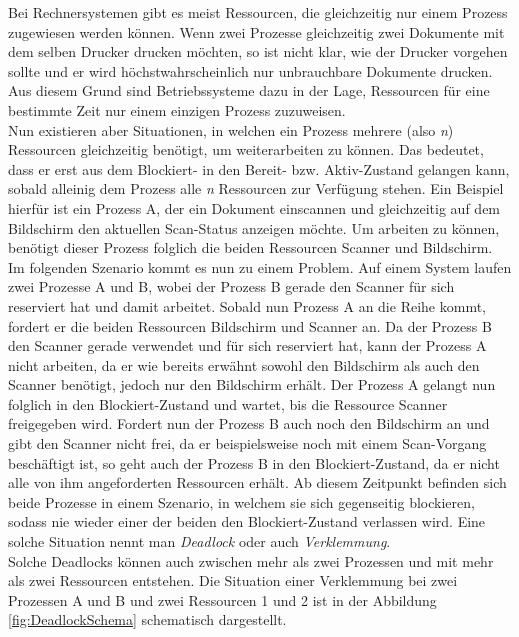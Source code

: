 				Bei Rechnersystemen gibt es meist Ressourcen, die gleichzeitig nur einem Prozess zugewiesen werden können. Wenn zwei Prozesse gleichzeitig zwei Dokumente mit dem selben Drucker drucken möchten, so ist nicht klar, wie der Drucker vorgehen sollte und er wird höchstwahrscheinlich nur unbrauchbare Dokumente drucken. Aus diesem Grund sind Betriebssysteme dazu in der Lage, Ressourcen für eine bestimmte Zeit nur einem einzigen Prozess zuzuweisen.\\
				Nun existieren aber Situationen, in welchen ein Prozess mehrere (also \textit{n}) Ressourcen gleichzeitig benötigt, um weiterarbeiten zu können. Das bedeutet, dass er erst aus dem Blockiert- in den Bereit- bzw. Aktiv-Zustand gelangen kann, sobald alleinig dem Prozess alle \textit{n} Ressourcen zur Verfügung stehen. Ein Beispiel hierfür ist ein Prozess A, der ein Dokument einscannen und gleichzeitig auf dem Bildschirm den aktuellen Scan-Status anzeigen möchte. Um arbeiten zu können, benötigt dieser Prozess folglich die beiden Ressourcen Scanner und Bildschirm.\\
				Im folgenden Szenario kommt es nun zu einem Problem. Auf einem System laufen zwei Prozesse A und B, wobei der Prozess B gerade den Scanner für sich reserviert hat und damit arbeitet. Sobald nun Prozess A an die Reihe kommt, fordert er die beiden Ressourcen Bildschirm und Scanner an. Da der Prozess B den Scanner gerade verwendet und für sich reserviert hat, kann der Prozess A nicht arbeiten, da er wie bereits erwähnt sowohl den Bildschirm als auch den Scanner benötigt, jedoch nur den Bildschirm erhält. Der Prozess A gelangt nun folglich in den Blockiert-Zustand und wartet, bis die Ressource Scanner freigegeben wird. Fordert nun der Prozess B auch noch den Bildschirm an und gibt den Scanner nicht frei, da er beispielsweise noch mit einem Scan-Vorgang beschäftigt ist, so geht auch der Prozess B in den Blockiert-Zustand, da er nicht alle von ihm angeforderten Ressourcen erhält. Ab diesem Zeitpunkt befinden sich beide Prozesse in einem Szenario, in welchem sie sich gegenseitig blockieren, sodass nie wieder einer der beiden den Blockiert-Zustand verlassen wird. Eine solche Situation nennt man \textit{Deadlock} oder auch \textit{Verklemmung}. \cite{DeadlockWikipedia}\\
				Solche Deadlocks können auch zwischen mehr als zwei Prozessen und mit mehr als zwei Ressourcen entstehen. Die Situation einer Verklemmung bei zwei Prozessen A und B und zwei Ressourcen 1 und 2 ist in der Abbildung \ref{fig:DeadlockSchema} schematisch dargestellt.
				

